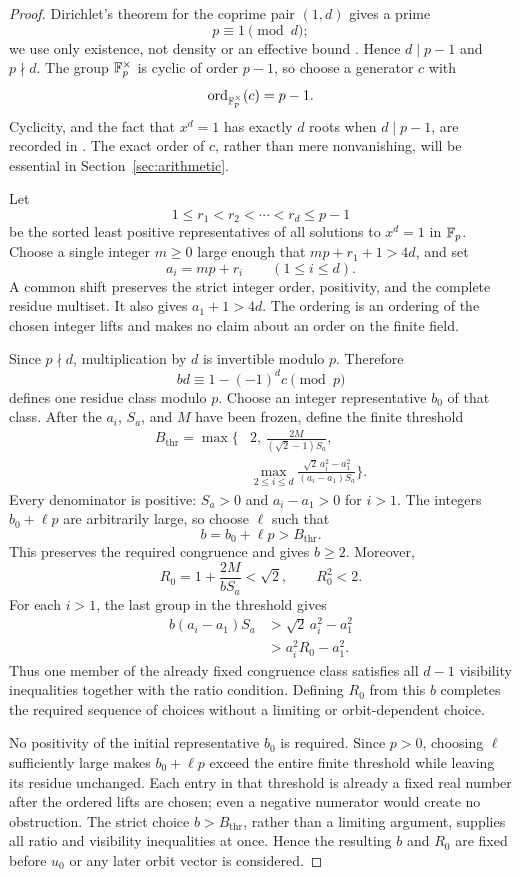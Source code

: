 \documentclass[11pt,letterpaper]{article}
\theoremstyle{plain}
\begin{document}
\begin{proof}
Dirichlet's theorem for the coprime pair $(1,d)$ gives a prime
\[
p\equiv1\pmod d;
\]
we use only existence, not density or an effective bound \cite[Chapter 16, Section 1, Theorem 1, p.~251]{StdIreland1990ModernNumberTheory}.  Hence $d\mid p-1$ and $p\nmid d$.  The group $\mathbb{F}_{p}^\times$ is cyclic of order $p-1$, so choose a generator $c$ with
\[
\operatorname{ord}_{\mathbb{F}_{p}^\times}(c)=p-1.
\]
Cyclicity, and the fact that $x^d=1$ has exactly $d$ roots when $d\mid p-1$, are recorded in \cite[Chapter 4, Section 1, pp.~39--41]{StdIreland1990ModernNumberTheory}.  The exact order of $c$, rather than mere nonvanishing, will be essential in Section~\ref{sec:arithmetic}.

Let
\[
1\leq r_1<r_2<\cdots<r_d\leq p-1
\]
be the sorted least positive representatives of all solutions to $x^d=1$ in $\mathbb{F}_{p}$.  Choose a single integer $m\geq0$ large enough that $mp+r_1+1>4d$, and set
\[
a_i=mp+r_i\qquad(1\leq i\leq d).
\]
A common shift preserves the strict integer order, positivity, and the complete residue multiset.  It also gives $a_1+1>4d$.  The ordering is an ordering of the chosen integer lifts and makes no claim about an order on the finite field.

Since $p\nmid d$, multiplication by $d$ is invertible modulo $p$.  Therefore
\[
bd\equiv1-(-1)^dc\pmod p
\]
defines one residue class modulo $p$.  Choose an integer representative $b_0$ of that class.  After the $a_i$, $S_a$, and $M$ have been frozen, define the finite threshold
\[
\begin{aligned}
B_{\mathrm{thr}}=\max\Biggl\{
&2,\,
\frac{2M}{(\sqrt{2}-1)S_a},\\
&\max_{2\leq i\leq d}
\frac{\sqrt{2}\,a_i^2-a_1^2}
{(a_i-a_1)S_a}
\Biggr\}.
\end{aligned}
\]
Every denominator is positive: $S_a>0$ and $a_i-a_1>0$ for $i>1$.  The integers $b_0+\ell p$ are arbitrarily large, so choose $\ell$ such that
\[
b=b_0+\ell p>B_{\mathrm{thr}}.
\]
This preserves the required congruence and gives $b\geq2$.  Moreover,
\[
R_0=1+\frac{2M}{bS_a}<\sqrt{2},
\qquad R_0^2<2.
\]
For each $i>1$, the last group in the threshold gives
\begin{align*}
b(a_i-a_1)S_a
&>\sqrt{2}\,a_i^2-a_1^2\\
&>a_i^2R_0-a_1^2.
\end{align*}
Thus one member of the already fixed congruence class satisfies all $d-1$ visibility inequalities together with the ratio condition.  Defining $R_0$ from this $b$ completes the required sequence of choices without a limiting or orbit-dependent choice.

No positivity of the initial representative \(b_0\) is required.  Since \(p>0\), choosing \(\ell\) sufficiently large makes \(b_0+\ell p\) exceed the entire finite threshold while leaving its residue unchanged.  Each entry in that threshold is already a fixed real number after the ordered lifts are chosen; even a negative numerator would create no obstruction.  The strict choice \(b>B_{\mathrm{thr}}\), rather than a limiting argument, supplies all ratio and visibility inequalities at once.  Hence the resulting \(b\) and \(R_0\) are fixed before \(u_0\) or any later orbit vector is considered.
\end{proof}
\end{document}
